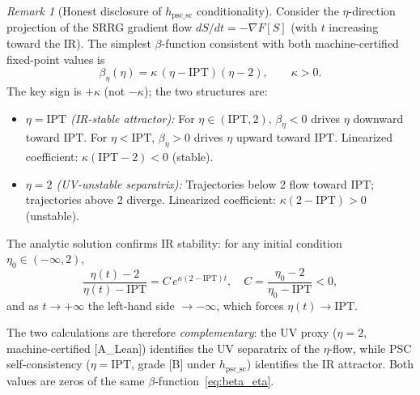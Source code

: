 \documentclass[11pt]{article}
\theoremstyle{remark}
\newtheorem{remark}[theorem]{Remark}
\newcommand{\IPT}{\mathrm{IPT}}
\begin{document}
\begin{remark}[Honest disclosure of $h_{\mathrm{psc\_sc}}$ conditionality]
Consider the $\eta$-direction projection of the SRRG gradient flow $dS/dt = -\nabla F[S]$
(with $t$ increasing toward the IR).  The simplest $\beta$-function consistent with both
machine-certified fixed-point values is
\begin{equation}
\label{eq:beta_eta}
\beta_\eta(\eta) = \kappa\,(\eta - \IPT)(\eta - 2), \qquad \kappa > 0.
\end{equation}
The key sign is $+\kappa$ (not $-\kappa$); the two structures are:
\begin{itemize}[leftmargin=2em]
\item \emph{$\eta = \IPT$ (IR-stable attractor):} For $\eta \in (\IPT, 2)$,
  $\beta_\eta < 0$ drives $\eta$ downward toward $\IPT$.
  For $\eta < \IPT$, $\beta_\eta > 0$ drives $\eta$ upward toward $\IPT$.
  Linearized coefficient: $\kappa(\IPT - 2) < 0$ (stable).
\item \emph{$\eta = 2$ (UV-unstable separatrix):} Trajectories below 2 flow toward
  $\IPT$; trajectories above 2 diverge.
  Linearized coefficient: $\kappa(2 - \IPT) > 0$ (unstable).
\end{itemize}
The analytic solution confirms IR stability: for any initial condition $\eta_0 \in (-\infty, 2)$,
\begin{equation}
\frac{\eta(t) - 2}{\eta(t) - \IPT} = C\,e^{\kappa(2-\IPT)t}, \quad
C = \frac{\eta_0 - 2}{\eta_0 - \IPT} < 0,
\end{equation}
and as $t \to +\infty$ the left-hand side $\to -\infty$, which forces $\eta(t) \to \IPT$.

The two calculations are therefore \emph{complementary}: the UV proxy ($\eta = 2$,
machine-certified [A\_Lean]) identifies the UV separatrix of the $\eta$-flow, while
PSC self-consistency ($\eta = \IPT$, grade [B] under $h_{\mathrm{psc\_sc}}$) identifies the IR attractor.
Both values are zeros of the same $\beta$-function~\eqref{eq:beta_eta}.


\end{remark}
\end{document}
